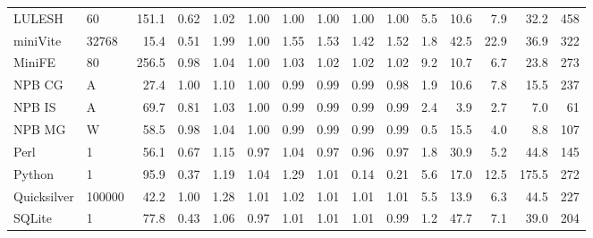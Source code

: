 \begin{tabular}{llrrrrrrrrrrrrr}
LULESH & 60 & 151.1 & 0.62 & 1.02 & 1.00 & 1.00 & 1.00 & 1.00 & 1.00 & 5.5 & 10.6 & 7.9 & 32.2 & 458 \\
miniVite & 32768 & 15.4 & 0.51 & 1.99 & 1.00 & 1.55 & 1.53 & 1.42 & 1.52 & 1.8 & 42.5 & 22.9 & 36.9 & 322 \\
MiniFE & 80 & 256.5 & 0.98 & 1.04 & 1.00 & 1.03 & 1.02 & 1.02 & 1.02 & 9.2 & 10.7 & 6.7 & 23.8 & 273 \\
NPB CG & A & 27.4 & 1.00 & 1.10 & 1.00 & 0.99 & 0.99 & 0.99 & 0.98 & 1.9 & 10.6 & 7.8 & 15.5 & 237 \\
NPB IS & A & 69.7 & 0.81 & 1.03 & 1.00 & 0.99 & 0.99 & 0.99 & 0.99 & 2.4 & 3.9 & 2.7 & 7.0 & 61 \\
NPB MG & W & 58.5 & 0.98 & 1.04 & 1.00 & 0.99 & 0.99 & 0.99 & 0.99 & 0.5 & 15.5 & 4.0 & 8.8 & 107 \\
Perl & 1 & 56.1 & 0.67 & 1.15 & 0.97 & 1.04 & 0.97 & 0.96 & 0.97 & 1.8 & 30.9 & 5.2 & 44.8 & 145 \\
Python & 1 & 95.9 & 0.37 & 1.19 & 1.04 & 1.29 & 1.01 & 0.14 & 0.21 & 5.6 & 17.0 & 12.5 & 175.5 & 272 \\
Quicksilver & 100000 & 42.2 & 1.00 & 1.28 & 1.01 & 1.02 & 1.01 & 1.01 & 1.01 & 5.5 & 13.9 & 6.3 & 44.5 & 227 \\
SQLite & 1 & 77.8 & 0.43 & 1.06 & 0.97 & 1.01 & 1.01 & 1.01 & 0.99 & 1.2 & 47.7 & 7.1 & 39.0 & 204 \\
\bottomrule
\end{tabular}
